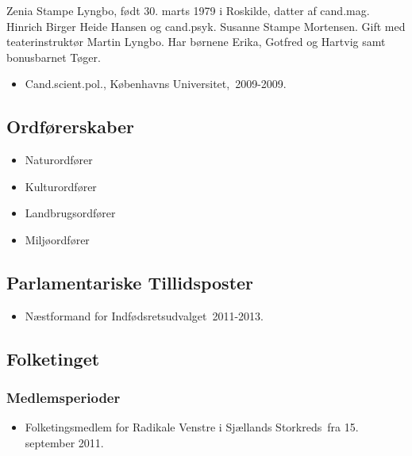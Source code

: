 \documentclass[11pt, a4paper]{awesome-cv}
\begin{document}
\makecvheader[R]
\makelettertitle
\begin{cvletter}
Zenia Stampe Lyngbo, født 30. marts 1979 i Roskilde, datter af cand.mag. Hinrich Birger Heide Hansen og cand.psyk. Susanne Stampe Mortensen. Gift med teaterinstruktør Martin Lyngbo. Har børnene Erika, Gotfred og Hartvig samt bonusbarnet Tøger.

\begin{itemize}
\item Cand.scient.pol., Københavns Universitet, 2009-2009.
\end{itemize}
\subsection*{Ordførerskaber}
\begin{itemize}
\item Naturordfører
\item Kulturordfører
\item Landbrugsordfører
\item Miljøordfører
\end{itemize}
\subsection*{Parlamentariske Tillidsposter}
\begin{itemize}
\item Næstformand for Indfødsretsudvalget 2011-2013.
\end{itemize}
\subsection*{Folketinget}
\subsubsection*{Medlemsperioder}
\begin{itemize}
\item Folketingsmedlem for Radikale Venstre i Sjællands Storkreds fra 15. september 2011.
\end{itemize}

\end{cvletter}
\end{document}
